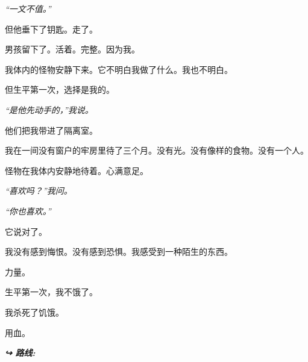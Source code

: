 \noindent \textit{“一文不值。”}

\noindent 但他垂下了钥匙。走了。

\noindent 男孩留下了。活着。完整。因为我。

\noindent 我体内的怪物安静下来。它不明白我做了什么。我也不明白。

\noindent 但生平第一次，选择是我的。

\noindent \textit{“是他先动手的，”我说。}

\noindent 他们把我带进了隔离室。

\noindent 我在一间没有窗户的牢房里待了三个月。没有光。没有像样的食物。没有一个人。

\noindent 怪物在我体内安静地待着。心满意足。

\noindent \textit{“喜欢吗？”我问。}

\noindent \textit{“你也喜欢。”}

\noindent 它说对了。

\noindent 我没有感到悔恨。没有感到恐惧。我感受到一种陌生的东西。

\noindent 力量。

\noindent 生平第一次，我不饿了。

\noindent 我杀死了饥饿。

\noindent 用血。

\vspace{0.5em}
\noindent\textit{\textbf{↪ 路线:}  \rotasep {} \rotasep {}}
